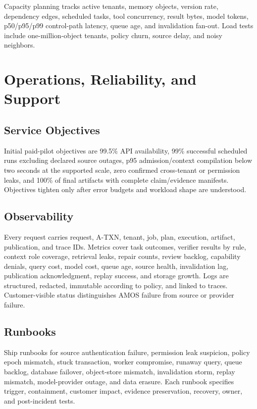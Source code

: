 \documentclass[10pt]{article}
\newcommand{\amos}{\textsc{AMOS}\xspace}
\newcommand{\atxn}{\textsc{A-TXN}\xspace}
\begin{document}
Capacity planning tracks active tenants, memory objects, version rate, dependency edges, scheduled tasks, tool concurrency, result bytes, model tokens, p50/p95/p99 control-path latency, queue age, and invalidation fan-out. Load tests include one-million-object tenants, policy churn, source delay, and noisy neighbors.

\section{Operations, Reliability, and Support}

\subsection{Service Objectives}

Initial paid-pilot objectives are 99.5\% API availability, 99\% successful scheduled runs excluding declared source outages, p95 admission/context compilation below two seconds at the supported scale, zero confirmed cross-tenant or permission leaks, and 100\% of final artifacts with complete claim/evidence manifests. Objectives tighten only after error budgets and workload shape are understood.

\subsection{Observability}

Every request carries request, \atxn, tenant, job, plan, execution, artifact, publication, and trace IDs. Metrics cover task outcomes, verifier results by rule, context role coverage, retrieval leaks, repair counts, review backlog, capability denials, query cost, model cost, queue age, source health, invalidation lag, publication acknowledgment, replay success, and storage growth. Logs are structured, redacted, immutable according to policy, and linked to traces. Customer-visible status distinguishes \amos failure from source or provider failure.

\subsection{Runbooks}

Ship runbooks for source authentication failure, permission leak suspicion, policy epoch mismatch, stuck transaction, worker compromise, runaway query, queue backlog, database failover, object-store mismatch, invalidation storm, replay mismatch, model-provider outage, and data erasure. Each runbook specifies trigger, containment, customer impact, evidence preservation, recovery, owner, and post-incident tests.
\end{document}
